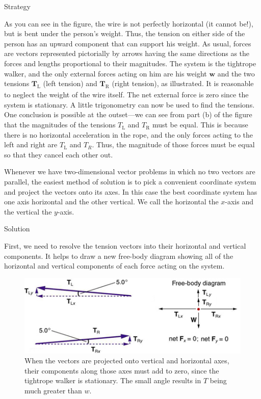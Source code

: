 \documentclass[
]{book}
\begin{document}
{Strategy}

As you can see in the figure, the wire is not perfectly horizontal (it
cannot be!), but is bent under the person's weight. Thus, the tension on
either side of the person has an upward component that can support his
weight. As usual, forces are vectors represented pictorially by arrows
having the same directions as the forces and lengths proportional to
their magnitudes. The system is the tightrope walker, and the only
external forces acting on him are his weight \(\textbf{w}{}\) and the two
tensions \(\textbf{T}_{\text{L}}{}\) (left
\textsubscript{} tension) and \(\textbf{T}_{\text{R}}{}\)
(right tension), as illustrated. It is reasonable to neglect the weight
of the wire itself. The net external force is zero since the system is
stationary. A little trigonometry can now be used to find the tensions.
One conclusion is possible at the outset---we can see from part (b) of
the figure that the magnitudes of the tensions \(T_{\text{L}}{}\) and
\(T_{\text{R}}{}\) must be equal. This is because there is no horizontal
acceleration in the rope, and the only forces acting to the left and
right are \(T_{\text{L}}{}\) and \(T_{R}{}\). Thus, the magnitude of those
forces must be equal so that they cancel each other out.

Whenever we have two-dimensional vector problems in which no two vectors
are parallel, the easiest method of solution is to pick a convenient
coordinate system and project the vectors onto its axes. In this case
the best coordinate system has one axis horizontal and the other
vertical. We call the horizontal the \(x{}\)-axis
\emph{} and the vertical the \(y{}\)-axis.

{Solution}

First, we need to resolve the tension vectors into their horizontal and
vertical components. It helps to draw a new free-body diagram showing
all of the horizontal and vertical components of each force acting on
the system.

\begin{figure}
\hypertarget{import-auto-id1561864}{%
\centering
\includegraphics{images/Figure_04_05_07.jpg}
\caption{When the vectors are projected onto vertical and horizontal axes,
their components along those axes must add to zero, since the tightrope
walker is stationary. The small angle results in \(T{}\) being much
greater than \(w{}\).}\label{import-auto-id1561864}
}
\end{figure}
\end{document}

